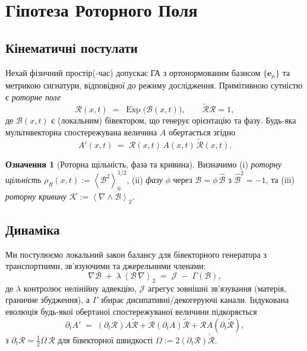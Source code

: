 \documentclass[11pt,a4paper]{article}
\newcommand{\e}{\mathbf{e}}
\newcommand{\grade}[2]{\left\langle #1 \right\rangle_{#2}}
\newcommand{\scal}[1]{\grade{#1}{0}}
\newcommand{\biv}[1]{\grade{#1}{2}}
\newcommand{\rev}[1]{\widetilde{#1}}           %
\newcommand{\Exp}{\operatorname{Exp}}
\newcommand{\Rotor}{\mathcal{R}}
\newcommand{\Biv}{\mathcal{B}}
\newcommand{\D}{\nabla}                        %
\theoremstyle{definition}
\newtheorem{definition}{Означення}
\theoremstyle{plain}
\theoremstyle{remark}
\begin{document}
\vspace{1em}

\section{Гіпотеза Роторного Поля}
\subsection{Кінематичні постулати}
Нехай фізичний простір(-час) допускає ГА з ортонормованим базисом $\{\e_\mu\}$ та метрикою сигнатури, відповідної до режиму дослідження. Примітивною сутністю є \emph{роторне поле}
\begin{equation}
  \Rotor(x,t) \;=\; \Exp\!\big(\Biv(x,t)\big),
  \qquad \rev{\Rotor}\Rotor = 1,
  \label{eq:rotor}
\end{equation}
де $\Biv(x,t)$ є (локальним) бівектором, що генерує орієнтацію та фазу. Будь-яка мультивекторна спостережувана величина $A$ обертається згідно
\begin{equation}
  A'(x,t) \;=\; \Rotor(x,t)\, A(x,t)\, \rev{\Rotor}(x,t).
\end{equation}

\begin{definition}[Роторна щільність, фаза та кривина]
Визначимо (i) \emph{роторну щільність} $\rho_R(x,t):=\scal{\Biv^2}^{1/2}$, (ii) \emph{фазу} $\phi$ через $\Biv=\phi\,\hat{\Biv}$ з $\hat{\Biv}^2=-1$, та (iii) \emph{роторну кривину} $\mathcal{K}:=\biv{\D \wedge \Biv}$.
\end{definition}

\subsection{Динаміка}
Ми постулюємо локальний закон балансу для бівекторного генератора з транспортними, зв'язуючими та джерельними членами:
\begin{equation}
  \D \Biv \;+\; \lambda\, \biv{\Biv\,\D} \;=\; \mathcal{J} \;-\; \Gamma(\Biv),
  \label{eq:rotor-dynamics}
\end{equation}
де $\lambda$ контролює нелінійну адвекцію, $\mathcal{J}$ агрегує зовнішні зв'язування (матерія, граничне збудження), а $\Gamma$ збирає дисипативні/декогеруючі канали. Індукована еволюція будь-якої обертаної спостережуваної величини підкоряється
\begin{equation}
  \partial_t A' \;=\; \left(\partial_t \Rotor\right) A \rev{\Rotor} + \Rotor \left(\partial_t A\right)\rev{\Rotor} + \Rotor A \left(\partial_t\rev{\Rotor}\right),
\end{equation}
з $\partial_t \Rotor = \frac{1}{2}\Omega\,\Rotor$ для бівекторної швидкості $\Omega:=2(\partial_t \Rotor)\rev{\Rotor}$.
\end{document}
